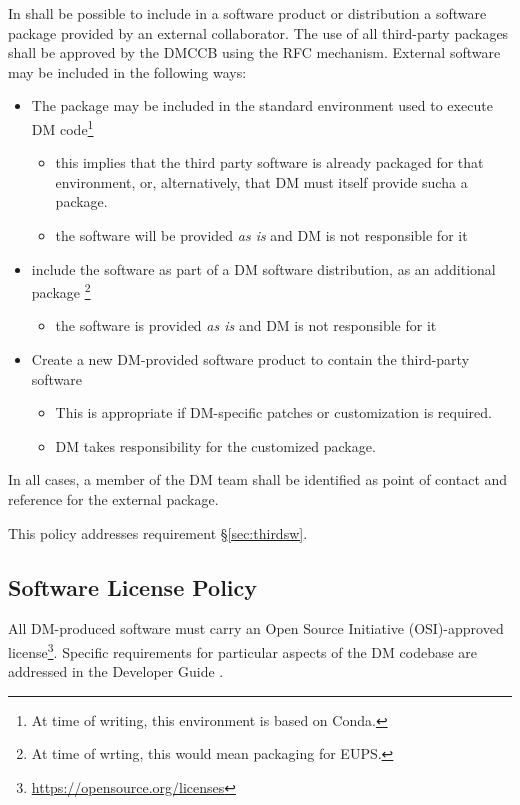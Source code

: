In shall be possible to include in a software product or distribution a software package provided by an external collaborator.
The use of all third-party packages shall be approved by the DMCCB using the RFC mechanism.
External software may be included in the following ways:

\begin{itemize}
\item The package may be included in the standard environment used to execute DM code\footnote{At time of writing, this environment is based on Conda.}
    \begin{itemize}
    \item this implies that the third party software is already packaged for that environment, or, alternatively, that DM must itself provide sucha a package.
    \item the software will be provided \textit{as is} and DM is not responsible for it
    \end{itemize}
\item include the software as part of a DM software distribution, as an additional package \footnote{At time of wrting, this would mean packaging for EUPS.}
    \begin{itemize}
    \item the software is provided \textit{as is} and DM is not responsible for it
    \end{itemize}
\item Create a new DM-provided software product to contain the third-party software
    \begin{itemize}
    \item This is appropriate if DM-specific patches or customization is required.
    \item DM takes responsibility for the customized package.
    \end{itemize}
\end{itemize}

In all cases, a member of the DM team shall be identified as point of contact and reference for the external package.

This policy addresses requirement \S\ref{sec:thirdsw}.


\subsection{Software License Policy} \label{sec:licensepolicy}

All DM-produced software must carry an Open Source Initiative (OSI)-approved license\footnote{\url{https://opensource.org/licenses}}.
Specific requirements for particular aspects of the DM codebase are addressed in the Developer Guide \citep{DevGuide}.


